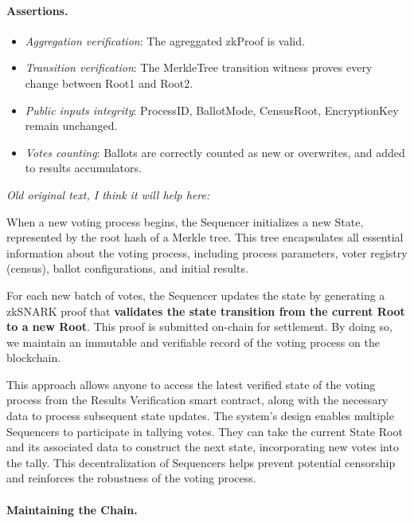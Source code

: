 \paragraph{Assertions.}

\begin{itemize}
	\item \emph{Aggregation verification}: The agreggated zkProof is valid.
	\item \emph{Transition verification}: The MerkleTree transition witness proves every change between Root1 and Root2.
	\item \emph{Public inputs integrity}: ProcessID, BallotMode, CensusRoot, EncryptionKey remain unchanged.
	\item \emph{Votes counting}: Ballots are correctly counted as new or overwrites, and added to results accumulators.
\end{itemize}


\noi \textit{Old original text, I think it will help here:}

When a new voting process begins, the Sequencer initializes a new State, represented by the root hash of a Merkle tree. This tree encapsulates all essential information about the voting process, including process parameters, voter registry (census), ballot configurations, and initial results.

For each new batch of votes, the Sequencer updates the state by generating a zkSNARK proof that \textbf{validates the state transition from the current Root to a new Root}. This proof is submitted on-chain for settlement. By doing so, we maintain an immutable and verifiable record of the voting process on the blockchain.

This approach allows anyone to access the latest verified state of the voting process from the Results Verification smart contract, along with the necessary data to process subsequent state updates. The system's design enables multiple Sequencers to participate in tallying votes. They can take the current State Root and its associated data to construct the next state, incorporating new votes into the tally. This decentralization of Sequencers helps prevent potential censorship and reinforces the robustness of the voting process.

\paragraph{Maintaining the Chain.}

